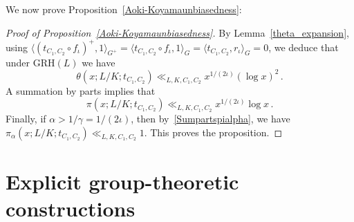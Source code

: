 \documentclass[12pt]{amsart}
\numberwithin{equation}{section}
\theoremstyle{definition}
\theoremstyle{remark}
\begin{document}
We now prove Proposition~\ref{Aoki-Koyamaunbiasedness}:
\begin{proof}[Proof of Proposition~\ref{Aoki-Koyamaunbiasedness}]
    By Lemma~\ref{theta_expansion}, using $\bigl\langle (t_{C_1,C_2}\circ f_\iota)^+, 1\bigr\rangle_{G^+}=\langle t_{C_1,C_2}\circ f_\iota,1\rangle_G=\langle t_{C_1,C_2},r_\iota\rangle_G=0$, we deduce that under $\mathrm{GRH}(L)$ we have
    \[\theta\left(x;L/K;t_{C_1,C_2}\right) \ll_{L,K,C_1,C_2} x^{1/(2\iota)}(\log x)^2\, . \]
    A summation by parts implies that 
    \[\pi\left(x;L/K;t_{C_1,C_2}\right)\ll_{L,K,C_1,C_2} x^{1/(2\iota)} \log x\, .\]
    Finally, if $\alpha>1/\gamma =1/(2\iota)$, then by~\eqref{Sumpartspialpha}, we have $\pi_\alpha\left(x;L/K;t_{C_1,C_2}\right)\ll_{L,K,C_1,C_2} 1$. This proves the proposition.
\end{proof}






















\section{Explicit group-theoretic constructions}\label{constructions}
\end{document}
